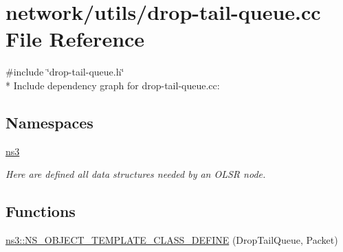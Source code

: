 \hypertarget{drop-tail-queue_8cc}{}\section{network/utils/drop-\/tail-\/queue.cc File Reference}
\label{drop-tail-queue_8cc}
{\ttfamily \#include \char`\"{}drop-\/tail-\/queue.\+h\char`\"{}}\\*
Include dependency graph for drop-\/tail-\/queue.cc\+:
\subsection*{Namespaces}
\begin{DoxyCompactItemize}
\item 
 \hyperlink{namespacens3}{ns3}
\begin{DoxyCompactList}\small\item\em Here are defined all data structures needed by an O\+L\+SR node. \end{DoxyCompactList}\end{DoxyCompactItemize}
\subsection*{Functions}
\begin{DoxyCompactItemize}
\item 
\hyperlink{namespacens3_a92627d548a63214bd56dfd984f72ccd3}{ns3\+::\+N\+S\+\_\+\+O\+B\+J\+E\+C\+T\+\_\+\+T\+E\+M\+P\+L\+A\+T\+E\+\_\+\+C\+L\+A\+S\+S\+\_\+\+D\+E\+F\+I\+NE} (Drop\+Tail\+Queue, Packet)
\end{DoxyCompactItemize}
